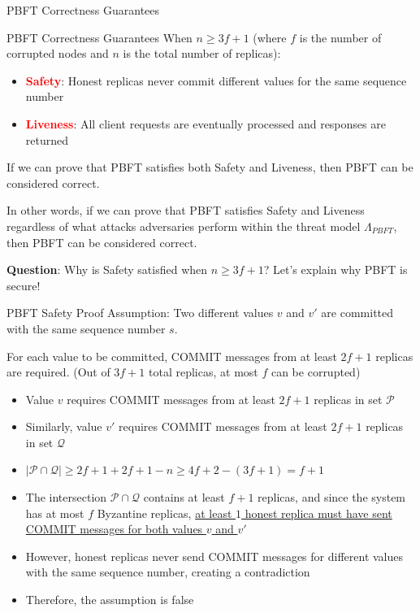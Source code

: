 \documentclass[aspectratio=169,10pt]{beamer}
\newenvironment{proofblock}[1][]
{\begin{block}{#1}\vspace{0.5em}}
{\vspace{0.5em}\end{block}}
\begin{document}
\begin{frame}{PBFT Correctness Guarantees}

\begin{proofblock}[PBFT Correctness Guarantees]
When $n \geq 3f + 1$ (where $f$ is the number of corrupted nodes and $n$ is the total number of replicas):
\begin{itemize}
    \item \textbf{\textcolor{red}{Safety}}: Honest replicas never commit different values for the same sequence number
    \item \textbf{\textcolor{red}{Liveness}}: All client requests are eventually processed and responses are returned
\end{itemize}

\vspace{0.5em}

If we can prove that PBFT satisfies both Safety and Liveness, then PBFT can be considered correct.
\end{proofblock}
In other words, if we can prove that PBFT satisfies Safety and Liveness regardless of what attacks adversaries perform within the threat model $\Lambda_{PBFT}$, then PBFT can be considered correct.

\vspace{0.5em}


\textbf{Question}: Why is Safety satisfied when $n \geq 3f + 1$? Let's explain why PBFT is secure!
\end{frame}

\begin{frame}{PBFT Safety Proof}
Assumption: Two different values $v$ and $v'$ are committed with the same sequence number $s$.

\begin{lemma}
For each value to be committed, COMMIT messages from at least $2f+1$ replicas are required. (Out of $3f+1$ total replicas, at most $f$ can be corrupted)
\end{lemma}

\begin{itemize}
\item \small Value $v$ requires COMMIT messages from at least $2f+1$ replicas in set $\mathcal{P}$
\item \small Similarly, value $v'$ requires COMMIT messages from at least $2f+1$ replicas in set $\mathcal{Q}$
\item \small $| \mathcal{P} \cap \mathcal{Q} | \geq 2f+1 + 2f+1 - n \geq 4f+2 - (3f+1) = f+1$
\item \small The intersection $\mathcal{P} \cap \mathcal{Q}$ contains at least $f+1$ replicas, and since the system has at most $f$ Byzantine replicas, \underline{at least $1$ honest replica must have sent COMMIT messages for both values $v$ and $v'$}
\item \small However, honest replicas never send COMMIT messages for different values with the same sequence number, creating a contradiction
\item \small Therefore, the assumption is false
\end{itemize}
\end{frame}
\end{document}
